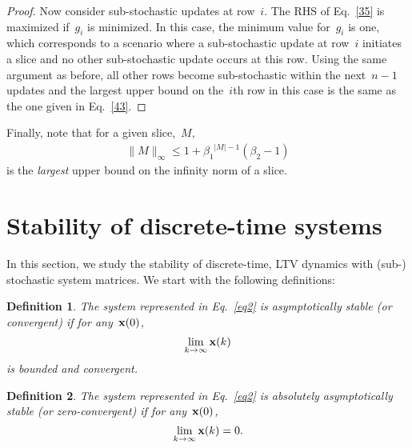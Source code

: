 \documentclass[draftclsnofoot, onecolumn, 12pt]{IEEEtran}
\newtheorem{definition}{Definition}
\begin{document}
\begin{proof}
Now consider sub-stochastic updates at row~$i$. The RHS of Eq.~\eqref{35} is maximized if~$g_i$ is minimized. In this case, the minimum value for~$g_i$ is one, which corresponds to a scenario where a sub-stochastic update at row~$i$ initiates a slice and no other sub-stochastic update occurs at this row. Using the same argument as before, all other rows become sub-stochastic within the next~$n-1$ updates and the largest upper bound on the~$i$th row in this case is the same as the one given in Eq.~\eqref{43}.
\end{proof}
Finally, note that for a given slice,~$M$, 
\begin{eqnarray}
\|M\|_\infty\leq 1+ {\beta_1}^{\vert {{{M}}} \vert-1}({\beta_2}-1)
\end{eqnarray}
is the \textit{largest} upper bound on the infinity norm of a slice.

\section{Stability of discrete-time  systems}\label{stability}
In this section, we study the stability of discrete-time, LTV dynamics with (sub-) stochastic system matrices. We start with the following definitions:
\begin{definition}
The system represented in Eq.~\eqref{eq2} is \textit{asymptotically stable} (or convergent) if for any~${\bf{x}}(0)$,
\begin{equation}
\lim_{k \rightarrow \infty}{\bf{x}}(k) \nonumber
\end{equation}
is bounded and convergent.
\end{definition}

\begin{definition}
The system represented in Eq.~\eqref{eq2} is \textit{absolutely asymptotically stable} (or zero-convergent) if for any~${\bf{x}}(0)$, 
\begin{equation}
\lim_{k \rightarrow \infty}{\bf{x}}(k)=0.\nonumber
\end{equation}
\end{definition}
\end{document}
